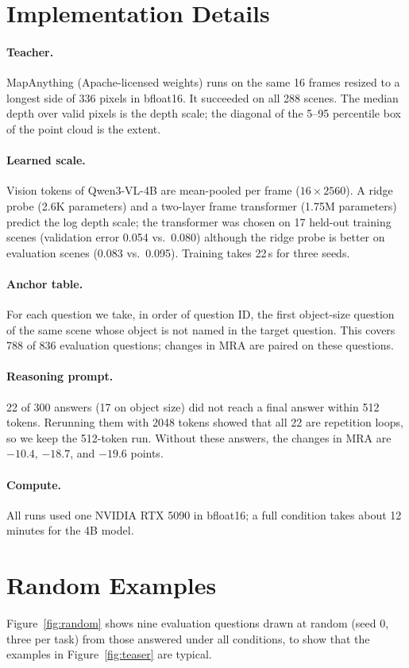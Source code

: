\documentclass[letterpaper]{article} %
\begin{document}
\section{Implementation Details}
\paragraph{Teacher.} MapAnything (Apache-licensed weights) runs on the same 16 frames resized to a longest side of 336 pixels in bfloat16. It succeeded on all 288 scenes. The median depth over valid pixels is the depth scale; the diagonal of the 5--95 percentile box of the point cloud is the extent.
\paragraph{Learned scale.} Vision tokens of Qwen3-VL-4B are mean-pooled per frame ($16 \times 2560$). A ridge probe (2.6K parameters) and a two-layer frame transformer (1.75M parameters) predict the log depth scale; the transformer was chosen on 17 held-out training scenes (validation error 0.054 vs.\ 0.080) although the ridge probe is better on evaluation scenes (0.083 vs.\ 0.095). Training takes 22\,s for three seeds.
\paragraph{Anchor table.} For each question we take, in order of question ID, the first object-size question of the same scene whose object is not named in the target question. This covers 788 of 836 evaluation questions; changes in MRA are paired on these questions.
\paragraph{Reasoning prompt.} 22 of 300 answers (17 on object size) did not reach a final answer within 512 tokens. Rerunning them with 2048 tokens showed that all 22 are repetition loops, so we keep the 512-token run. Without these answers, the changes in MRA are $-10.4$, $-18.7$, and $-19.6$ points.
\paragraph{Compute.} All runs used one NVIDIA RTX 5090 in bfloat16; a full condition takes about 12 minutes for the 4B model.

\section{Random Examples}
Figure~\ref{fig:random} shows nine evaluation questions drawn at random (seed 0, three per task) from those answered under all conditions, to show that the examples in Figure~\ref{fig:teaser} are typical.
\end{document}
